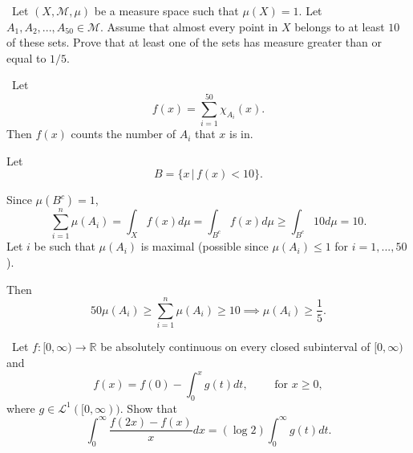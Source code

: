 \documentclass[12pt]{Qual}
\begin{document}
\begin{problem} $\,$
Let $(X,\mathscr{M},\mu)$ be a measure space such that $\mu(X)=1.$ Let $A_1, A_2,...,A_{50}\in\mathscr{M}$. Assume that almost every point in $X$ belongs to at least $10$ of these sets. Prove that at least one of the sets has measure greater than or equal to $1/5.$
\end{problem}


\begin{solution}$\,$
Let $$f(x)=\sum_{i=1}^{50}\chi_{A_i}(x).$$ Then $f(x)$ counts the number of $A_i$ that $x$ is in.

Let $$B=\{x\,|\, f(x)<10\}.$$

Since $\mu(B^c)=1$, $$\sum_{i=1}^n\mu(A_i)=\int_Xf(x)d\mu=\int_{B^c}f(x)d\mu\ge\int_{B^c}10d\mu=10.$$ Let $i$ be such that $\mu(A_i)$ is maximal (possible since $\mu(A_i)\le 1$ for $i=1,...,50$).

Then $$50\mu(A_i)\ge\sum_{i=1}^n\mu(A_i)\ge10\implies \mu(A_i)\ge\frac{1}{5}.$$
\end{solution}
\newpage

\begin{problem} $\,$
Let $f:[0,\infty)\to\mathbb{R}$ be absolutely continuous on every closed subinterval of $[0,\infty)$ and $$f(x)=f(0)-\int_0^xg(t)dt,\qquad\text{ for }x\ge0,$$ where $g\in\mathscr{L}^1([0,\infty)).$ Show that $$\int_0^\infty\frac{f(2x)-f(x)}{x}dx=(\log 2)\int_0^\infty g(t)dt.$$
\end{problem}
\end{document}
